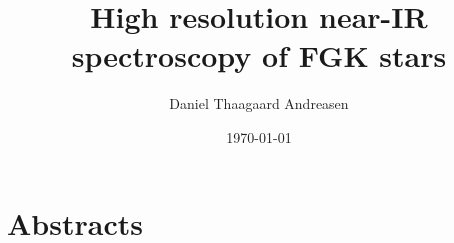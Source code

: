 \documentclass[a4paper,
11pt,
twoside,
]{memoir}
\begin{document}
    \title{High resolution near-IR spectroscopy of FGK stars}
    \author{Daniel Thaagaard Andreasen}
    \date{\today}
    \maketitle
\frontmatter
%


%
%
\tableofcontents  %
\thispagestyle{empty}

\newpage
\chapter*{Abstracts}
\newpage
\listoffigures
\listoftables
\mainmatter





\thispagestyle{empty}


%    


%
%
\end{document}
